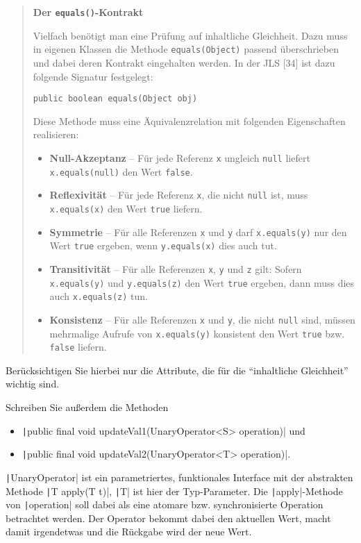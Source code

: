 \documentclass[11pt]{exam} %
\newcommand{\code}[1]{\texttt|#1|}
\begin{document}
\blockquote{
\textbf{Der \texttt{equals()}-Kontrakt}\par\nobreak
Vielfach benötigt man eine Prüfung auf inhaltliche Gleichheit. Dazu muss in eigenen
Klassen die Methode \texttt{equals(Object)} passend überschrieben und dabei deren Kontrakt
eingehalten werden. In der JLS [34] ist dazu folgende Signatur festgelegt:\par
\leavevmode{\parindent=1em\indent} \texttt{public boolean equals(Object obj)}\par
Diese Methode muss eine Äquivalenzrelation mit folgenden Eigenschaften realisieren:
\begin{itemize}
\item \textbf{Null-Akzeptanz} – Für jede Referenz \texttt{x} ungleich \texttt{null} liefert \texttt{x.equals(null)}
den Wert \texttt{false}.
\item \textbf{Reflexivität} – Für jede Referenz \texttt{x}, die nicht \texttt{null} ist, muss \texttt{x.equals(x)} den
Wert \texttt{true} liefern.
\item \textbf{Symmetrie} – Für alle Referenzen \texttt{x} und \texttt{y} darf \texttt{x.equals(y)} nur den Wert \texttt{true}
ergeben, wenn \texttt{y.equals(x)} dies auch tut.
\item \textbf{Transitivität} – Für alle Referenzen \texttt{x}, \texttt{y} und \texttt{z} gilt: Sofern \texttt{x.equals(y)} und
\texttt{y.equals(z)} den Wert \texttt{true} ergeben, dann muss dies auch \texttt{x.equals(z)} tun.
\item \textbf{Konsistenz} – Für alle Referenzen \texttt{x} und \texttt{y}, die nicht \texttt{null} sind, müssen mehrmalige
Aufrufe von \texttt{x.equals(y)} konsistent den Wert \texttt{true} bzw. \texttt{false} liefern.
\end{itemize}
}

Berücksichtigen Sie hierbei nur die Attribute, die für die ``inhaltliche Gleichheit'' wichtig sind.\par
Schreiben Sie außerdem die Methoden
\begin{itemize}
\item \code{public final void updateVal1(UnaryOperator<S> operation)} und
\item \code{public final void updateVal2(UnaryOperator<T> operation)}.
\end{itemize}
\code{UnaryOperator} ist ein parametriertes, funktionales Interface mit der abstrakten Methode \newline\code{T apply(T t)}, \code{T} ist hier der Typ-Parameter. Die \code{apply}-Methode von \code{operation} soll dabei als eine atomare bzw. synchronisierte Operation betrachtet werden. Der Operator bekommt dabei den aktuellen Wert, macht damit irgendetwas und die Rückgabe wird der neue Wert.
\end{document}
